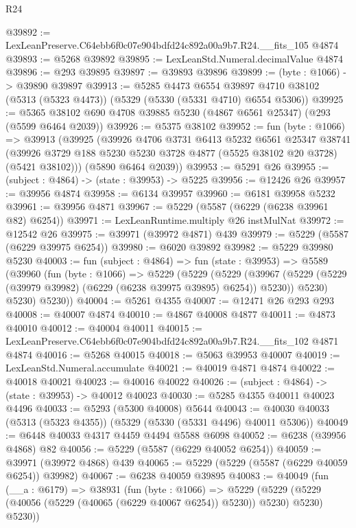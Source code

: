 \begin{lexlean}{R24}
\begin{coremodule}
@39892 := LexLeanPreserve.C64ebb6f0c07e904bdfd24c892a00a9b7.R24.__fits_105 @4874
@39893 := @5268 @39892
@39895 := LexLeanStd.Numeral.decimalValue @4874
@39896 := @293 @39895
@39897 := @39893 @39896
@39899 := (byte : @1066) -> @39890 @39897
@39913 := @5285
    @4473
    @6554
    @39897
    @4710
    @38102
    (@5313 (@5323 @4473))
    (@5329 (@5330 (@5331 @4710) @6554 @5306))
@39925 := @5365 @38102 @690 @4708 @39885 @5230 (@4867 @6561 @25347) (@293 (@5599 @6464 @2039))
@39926 := @5375 @38102
@39952 := fun (byte : @1066) =>
  @39913
    (@39925
      (@39926
        @4706
        @3731
        @6413
        @5232
        @6561
        @25347
        @38741
        (@39926 @3729 @188 @5230 @5230 @3728 @4877 (@5525 @38102 @20 @3728) (@5421 @38102)))
      (@5890 @6464 @2039))
@39953 := @5291 @26
@39955 := (subject : @4864) -> (state : @39953) -> @5225
@39956 := @12426 @26
@39957 := @39956 @4874
@39958 := @6134 @39957
@39960 := @6181 @39958 @5232
@39961 := @39956 @4871
@39967 := @5229 (@5587 (@6229 (@6238 @39961 @82) @6254))
@39971 := LexLeanRuntime.multiply @26 instMulNat
@39972 := @12542 @26
@39975 := @39971 (@39972 @4871) @439
@39979 := @5229 (@5587 (@6229 @39975 @6254))
@39980 := @6020 @39892
@39982 := @5229 @39980 @5230
@40003 := fun (subject : @4864) =>
  fun (state : @39953) =>
  @5589
    (@39960
      (fun (byte : @1066) =>
      @5229
        (@5229
          (@5229
            (@39967 (@5229 (@5229 (@39979 @39982) (@6229 (@6238 @39975 @39895) @6254)) @5230))
            @5230)
          @5230)
        @5230))
@40004 := @5261 @4355
@40007 := @12471 @26 @293 @293
@40008 := @40007 @4874
@40010 := @4867 @40008 @4877
@40011 := @4873 @40010
@40012 := @40004 @40011
@40015 := LexLeanPreserve.C64ebb6f0c07e904bdfd24c892a00a9b7.R24.__fits_102 @4871 @4874
@40016 := @5268 @40015
@40018 := @5063 @39953 @40007
@40019 := LexLeanStd.Numeral.accumulate
@40021 := @40019 @4871 @4874
@40022 := @40018 @40021
@40023 := @40016 @40022
@40026 := (subject : @4864) -> (state : @39953) -> @40012 @40023
@40030 := @5285 @4355 @40011 @40023 @4496
@40033 := @5293 (@5300 @40008) @5644
@40043 := @40030 @40033 (@5313 (@5323 @4355)) (@5329 (@5330 (@5331 @4496) @40011 @5306))
@40049 := @6448 @40033 @4317 @4459 @4494 @5588 @6098
@40052 := @6238 (@39956 @4868) @82
@40056 := @5229 (@5587 (@6229 @40052 @6254))
@40059 := @39971 (@39972 @4868) @439
@40065 := @5229 (@5229 (@5587 (@6229 @40059 @6254)) @39982)
@40067 := @6238 @40059 @39895
@40083 := @40049
    (fun (__a : @6179) =>
    @38931
      (fun (byte : @1066) =>
      @5229 (@5229 (@5229 (@40056 (@5229 (@40065 (@6229 @40067 @6254)) @5230)) @5230) @5230) @5230))

\end{coremodule}
\end{lexlean}
